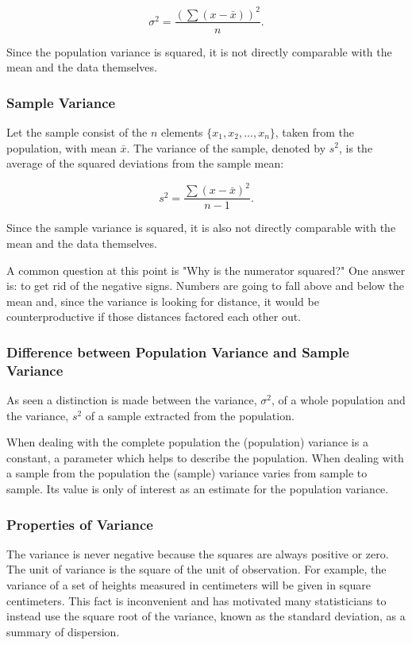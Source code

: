 \begin{equation}
\sigma^2 = \frac{(\sum(x - \bar{x}))^2}{n}.
\label{eq:popvariance}
\end{equation}

Since the population variance is squared, it is not directly comparable with the mean and the data themselves.

\subsubsection{Sample Variance}
Let the sample consist of the $n$ elements $\{x_1,x_2,\ldots,x_n\}$, taken from the population, with mean $\bar{x}$. The variance of the sample, denoted by $s^2$, is the average of the squared deviations from the sample mean:

\begin{equation}
s^2 = \frac{\sum(x - \bar{x})^2}{n-1}.
\end{equation}

Since the sample variance is squared, it is also not directly comparable with the mean and the data themselves.

A common question at this point is "Why is the numerator squared?" One answer is: to get rid of the negative signs. Numbers are going to fall above and below the mean and, since the variance is looking for distance, it would be counterproductive if those distances factored each other out.

\subsubsection{Difference between Population Variance and Sample Variance}
As seen a distinction is made between the variance, $\sigma^2$, of a whole population and the variance, $s^2$ of a sample extracted from the population.

When dealing with the complete population the (population) variance is a constant, a parameter which helps to describe the population. When dealing with a sample from the population the (sample) variance varies from sample to sample. Its value is only of interest as an estimate for the population variance.

\subsubsection{Properties of Variance}
The variance is never negative because the squares are always positive or zero. The unit of variance is the square of the unit of observation. For example, the variance of a set of heights measured in centimeters will be given in square centimeters. This fact is inconvenient and has motivated many statisticians to instead use the square root of the variance, known as the standard deviation, as a summary of dispersion.

